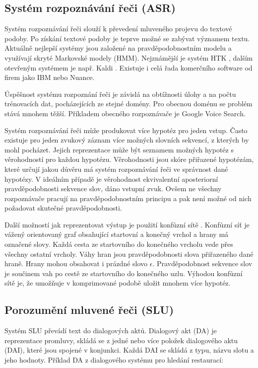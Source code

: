 \subsection{Systém rozpoznávání řeči (ASR)}

Systém rozpoznávání řeči slouží k převedení mluveného projevu do textové podoby. 
Po získání textové podoby je teprve možné se zabývat významem textu.
Aktuálně nejlepší systémy jsou založené na pravděpodobnostním modelu a využívají skryté Markovské modely (HMM). 
Nejznámější je systém HTK \cite{young2002htk}, dalším otevřeným systémem je např. Kaldi \cite{Povey_ASRU2011}.
Existuje i celá řada komerčního software od firem jako IBM nebo Nuance.

Úspěšnost systému rozpoznání řeči je závislá na obtížnosti úlohy a na počtu trénovacích dat, pocházejících ze stejné domény.
Pro obecnou doménu se problém stává mnohem těžší.
Příkladem obecného rozpoznávače je Google Voice Search.

Systém rozpoznávání řeči může produkovat více hypotéz pro jeden vstup.
Často existuje pro jeden zvukový záznam více možných slovních sekvencí, z kterých by mohl pocházet.
Jejich reprezentace může být seznamem možných hypotéz s věrohodností pro každou hypotézu.
Věrohodnosti jsou skóre přiřazené hypotézám, které určují jakou důvěru má systém rozpoznávání řeči ve správnost dané hypotézy.
V ideálním případě je věrohodnost ekvivalentní aposteriorní pravděpodobnosti sekvence slov, dáno vstupní zvuk.
Ovšem ne všechny rozpoznávače pracují na pravděpodobnostním principu a pak není možné od nich požadovat skutečné pravděpodobnosti.

Další možností jak reprezentovat výstup je použití konfůzní sítě \cite{bertoldi2005new}. 
Konfůzní síť je vážený orientovaný graf obsahující startovní a konečný vrchol a hrany má označené slovy. 
Každá cesta ze startovního do konečného vrcholu vede přes všechny ostatní vrcholy. 
Váhy hran jsou pravděpodobnosti slova přiřazeného dané hraně. 
Hrany mohou obsahovat i prázdné slovo $\epsilon$.
Pravděpodobnost sekvence slov je součinem vah po cestě ze startovního do konečného uzlu.
Výhodou konfůzní sítě je, že umožňuje v komprimované podobě uložit mnohem více hypotéz.

\subsection{Porozumění mluvené řeči (SLU)}

Systém SLU převádí text do dialogových aktů. 
Dialogový akt (DA) je reprezentace promluvy, skládá se z jedné nebo více položek dialogového aktu (DAI), které jsou spojené v konjunkci.
Každá DAI se skládá z typu, názvu slotu a jeho hodnoty. 
Příklad DA z dialogového systému pro hledání restaurací:

